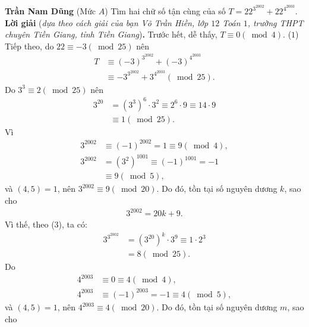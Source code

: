 \begin{multicols}{2}
	\vskip 0.05cm
	\hfill	\textbf{\color{thachthuctoanhoc}Trần Nam Dũng}
	\vskip 0.05cm
	{}
	(Mức $A$) Tìm hai chữ số tận cùng của số $T=22^{3^{2002}}+22^{4^{2003}}$.
	\vskip 0.05cm
	\textbf{\color{thachthuctoanhoc}Lời giải} (\textit{dựa theo cách giải của bạn Võ Trần Hiền, lớp $12$ Toán $1$, trường THPT chuyên Tiền Giang, tỉnh Tiền Giang})\textbf{\color{thachthuctoanhoc}.}
	\vskip 0.05cm
	Trước hết, dễ thấy, $T \equiv 0\left( {\bmod 4} \right)$. \hfill ($1$)
	\vskip 0.05cm
	Tiếp theo, do  $22 \equiv  - 3\left( {\bmod 25} \right)$ nên
	\begin{align*}
		T &\equiv {\left( { - 3} \right)^{{3^{2002}}}} + {\left( { - 3} \right)^{{4^{2003}}}} \\
		&\equiv  - {3^{{3^{2002}}}} + {3^{{4^{2003}}}}\left( {\bmod 25} \right). \tag{$2$}
	\end{align*}
	Do  ${3^3} \equiv 2\left( {\bmod 25} \right)$ nên
	\begin{align*}
		{3^{20}} &= {\left( {{3^3}} \right)^6} \cdot {3^2} \equiv {2^6} \cdot 9 \equiv 14 \cdot 9 \\
		&\equiv 1\left( {\bmod 25} \right). \tag{$3$}
	\end{align*}
	Vì
	\begin{align*}
		{3^{2002}} &\equiv {\left( { - 1} \right)^{2002}} = 1 \equiv 9\left( {\bmod 4} \right),\\
		{3^{2002}} &= {\left( {{3^2}} \right)^{1001}} \equiv {\left( { - 1} \right)^{1001}} =  - 1 \\
		&\equiv 9\left( {\bmod 5} \right),
	\end{align*}
	và $(4, 5) = 1$, nên ${3^{2002}} \equiv 9\left( {\bmod 20} \right)$.  Do đó, tồn tại số nguyên dương $k$, sao cho
	\begin{align*}
		{3^{2002}} = 20k + 9.
	\end{align*}
	Vì thế, theo ($3$), ta có:
	\begin{align*}
			{3^{{3^{2002}}}} &= {\left( {{3^{20}}} \right)^k} \cdot {3^9} \equiv 1 \cdot 2^3 \\
		&= 8\left({\bmod 25} \right). \tag{$4$}
	\end{align*}
	Do
	\begin{align*}
		{4^{2003}} &\equiv 0 \equiv 4\left( {\bmod 4} \right),\\
		{4^{2003}} &\equiv {\left( { - 1} \right)^{2003}} =  - 1 \equiv 4\left( {\bmod 5} \right),
	\end{align*}
	và $(4, 5) = 1$, nên ${4^{2003}} \equiv 4\left( {\bmod 20} \right)$.  Do đó, tồn tại số nguyên dương $m$, sao cho

\end{multicols}
